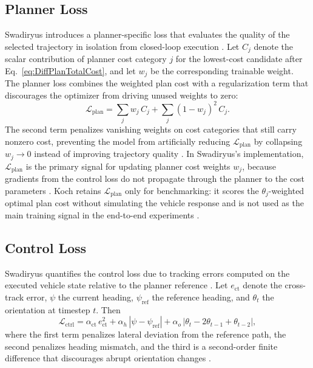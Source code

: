 \subsection{Planner Loss}

Swadiryus introduces a planner-specific loss that evaluates the quality of the selected trajectory in isolation from closed-loop execution \cite{swadiryus_DifferentiableMotionPlanning_2025}.
Let $C_j$ denote the scalar contribution of planner cost category $j$ for the lowest-cost candidate after Eq.~\eqref{eq:DiffPlanTotalCost}, and let $w_j$ be the corresponding trainable weight.
The planner loss combines the weighted plan cost with a regularization term that discourages the optimizer from driving unused weights to zero:
\begin{equation}
    \mathcal{L}_{\text{plan}} = \sum_j w_j\, C_j + \sum_j (1 - w_j)^2\, C_j.
    \label{eq:DiffPlanPlanLoss}
\end{equation}
The second term penalizes vanishing weights on cost categories that still carry nonzero cost, preventing the model from artificially reducing $\mathcal{L}_{\text{plan}}$ by collapsing $w_j \to 0$ instead of improving trajectory quality \cite{swadiryus_DifferentiableMotionPlanning_2025}.
In Swadiryus's implementation, $\mathcal{L}_{\text{plan}}$ is the primary signal for updating planner cost weights $w_j$, because gradients from the control loss do not propagate through the planner to the cost parameters \cite{swadiryus_DifferentiableMotionPlanning_2025}.
Koch retains $\mathcal{L}_{\text{plan}}$ only for benchmarking: it scores the $\theta_j$-weighted optimal plan cost without simulating the vehicle response and is not used as the main training signal in the end-to-end experiments \cite{koch_DifferentiableInterpretablePath_2025}.

\subsection{Control Loss}

Swadiryus quantifies the control loss due to tracking errors computed on the executed vehicle state relative to the planner reference \cite{swadiryus_DifferentiableMotionPlanning_2025}.
Let $e_{\text{ct}}$ denote the cross-track error, $\psi$ the current heading, $\psi_{\text{ref}}$ the reference heading, and $\theta_t$ the orientation at timestep $t$.
Then
\begin{equation}
    \mathcal{L}_{\text{ctrl}} = \alpha_{\text{ct}}\, e_{\text{ct}}^{2} + \alpha_{h}\,|\psi - \psi_{\text{ref}}| + \alpha_{o}\,|\theta_t - 2\theta_{t-1} + \theta_{t-2}|,
    \label{eq:DiffPlanCtrlLoss}
\end{equation}
where the first term penalizes lateral deviation from the reference path, the second penalizes heading mismatch, and the third is a second-order finite difference that discourages abrupt orientation changes \cite{swadiryus_DifferentiableMotionPlanning_2025}.

